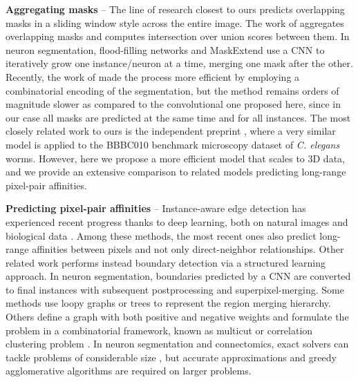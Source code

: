 \textbf{Aggregating \maskname masks} -- 
The line of research closest to ours predicts overlapping \maskname masks in a sliding window style across the entire image. The work of \cite{liu2016multi} aggregates overlapping masks and computes intersection over union scores between them.
In neuron segmentation, flood-filling networks \cite{januszewski2018high} and MaskExtend \cite{meirovitch2016multi} use a CNN to iteratively grow one instance/neuron at a time, merging one mask after the other. Recently, the work of \cite{meirovitch2019cross} made the process more efficient by employing a combinatorial encoding of the segmentation, but the method remains orders of magnitude slower as compared to the convolutional one proposed here, since in our case all masks are predicted at the same time and for all instances.
The most closely related work to ours is the independent preprint \cite{hirsch2020patchperpix}, where a very similar model is applied to the BBBC010 benchmark microscopy dataset of \emph{C. elegans} worms. However, here we propose a more efficient model that scales to 3D data, and we provide an extensive comparison to related models predicting long-range pixel-pair affinities. 

\textbf{Predicting pixel-pair affinities} --  
Instance-aware edge detection has experienced recent progress thanks to deep learning, both on natural images \cite{Gao_2019_ICCV,liu2018affinity,kirillov2017instancecut,xie2015holistically,kokkinos2015pushing} and biological data \cite{lee2017superhuman,wolf2018mutex,schmidt2018cell,zeng2017deepem3d,parag2017anisotropic,bailoni2019generalized,meirovitch2016multi,ciresan2012deep}. Among these methods, the most recent ones also predict long-range affinities between pixels and not only direct-neighbor relationships.
Other related work \cite{funke2018large,turaga2009maximin} performs instead boundary detection via a structured learning approach.
In neuron segmentation, boundaries predicted by a CNN are converted to final instances with subsequent postprocessing and superpixel-merging.
Some methods use loopy graphs \cite{kaynig2015large,krasowski2015improving} or trees \cite{meirovitch2016multi,liu2016sshmt,liu2014modular,funke2015learning,uzunbas2016efficient,nunez2013machine,knowles2016rhoananet} to represent the region merging hierarchy. 
Others define a graph with both positive and negative weights and formulate the problem in a combinatorial framework, known as multicut or correlation clustering problem \cite{kappes2011globally,chopra1991multiway,beier2017multicut}. 
In neuron segmentation and connectomics, exact solvers can tackle problems of considerable size \cite{andres2012globally}, but accurate approximations \cite{pape2017solving,beier2017multicut,beier2016efficient,yarkony2012fast,beier2014cut} and greedy agglomerative algorithms \cite{levinkov2017comparative,wolf2019mutex,bailoni2019generalized} are required on larger problems.


